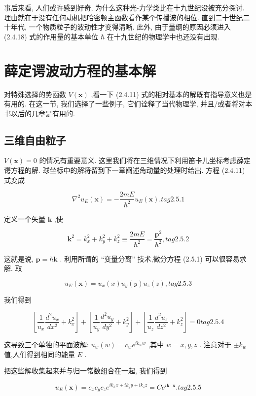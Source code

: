 \documentclass[lang=cn,newtx,10pt,scheme=chinese,thmcnt=section]{elegantbook}
\begin{document}
事后来看, 人们或许感到好奇, 为什么这种光-力学类比在十九世纪没被充分探讨. 理由就在于没有任何动机把哈密顿主函数看作某个传播波的相位. 直到二十世纪二十年代, 一个物质粒子的波动性才变得清晰. 此外, 由于量纲的原因必须进入 (2.4.18) 式的作用量的基本单位 $\hbar$ 在十九世纪的物理学中也还没有出现.


\section{薛定谔波动方程的基本解}
对特殊选择的势函数 $V\left( \mathbf{x}\right)$ ,看一下 (2.4.11) 式的相对基本的解既有指导意义也是有用的. 在这一节, 我们选择了一些例子, 它们诠释了当代物理学, 并且/或者将对本书以后的几章是有用的.
\subsection*{三维自由粒子}
$V\left( \mathbf{x}\right) = 0$ 的情况有重要意义. 这里我们将在三维情况下利用笛卡儿坐标考虑薛定谔方程的解. 球坐标中的解将留到下一章阐述角动量的处理时给出. 方程 (2.4.11) 式变成

$$
{\nabla }^{2}{u}_{E}\left( \mathbf{x}\right) = - \frac{2mE}{{\hbar }^{2}}{u}_{E}\left( \mathbf{x}\right) . tag{2.5.1}
$$

定义一个矢量 $\mathbf{k}$ ,使

$$
{\mathbf{k}}^{2} = {k}_{x}^{2} + {k}_{y}^{2} + {k}_{z}^{2} \equiv \frac{2mE}{{\hbar }^{2}} = \frac{{\mathbf{p}}^{2}}{{\hbar }^{2}}, tag{2.5.2}
$$

这就是说, $\mathbf{p} = \hbar \mathbf{k}$ . 利用所谓的 “变量分离” 技术,微分方程 (2.5.1) 可以很容易求解. 取

$$
{u}_{E}\left( \mathbf{x}\right) = {u}_{x}\left( x\right) {u}_{y}\left( y\right) {u}_{z}\left( z\right) , tag{2.5.3}
$$

我们得到

$$
\left\lbrack {\frac{1}{{u}_{x}}\frac{{d}^{2}{u}_{x}}{d{x}^{2}} + {k}_{x}^{2}}\right\rbrack + \left\lbrack {\frac{1}{{u}_{y}}\frac{{d}^{2}{u}_{y}}{d{y}^{2}} + {k}_{y}^{2}}\right\rbrack + \left\lbrack {\frac{1}{{u}_{z}}\frac{{d}^{2}{u}_{z}}{d{z}^{2}} + {k}_{z}^{2}}\right\rbrack = 0 tag{2.5.4}
$$

这导致三个单独的平面波解: ${u}_{w}\left( w\right) = {c}_{w}{e}^{i{k}_{w}w}$ ,其中 $w = x, y, z$ . 注意对于 $\pm {k}_{w}$ 值,人们得到相同的能量 $E$ .

把这些解收集起来并与归一常数组合在一起, 我们得到

$$
{u}_{E}\left( \mathbf{x}\right) = {c}_{x}{c}_{y}{c}_{z}{e}^{i{k}_{x}x + i{k}_{y}y + i{k}_{z}z} = C{e}^{i\mathbf{k} \cdot \mathbf{x}}. tag{2.5.5}
$$
\end{document}
